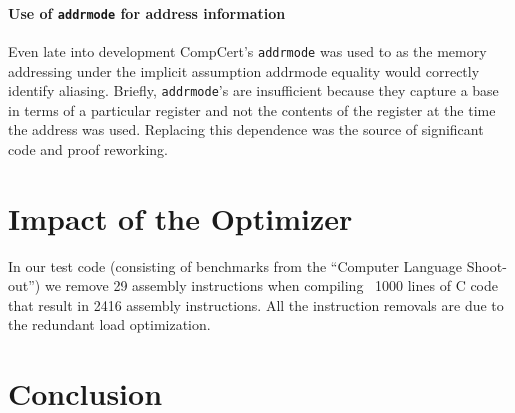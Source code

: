 \documentclass{article}
\begin{document}
\paragraph{Use of {\tt addrmode} for address information}
Even late into development CompCert's {\tt addrmode} was used to as the
memory addressing under the implicit assumption addrmode equality would 
correctly identify aliasing.  Briefly, {\tt addrmode}'s are
insufficient because they capture a base in terms of a particular register
and not the contents of the register at the time the address was used.
Replacing this dependence was the source of significant code and proof
reworking.


\section{Impact of the Optimizer}
In our test code (consisting of benchmarks from the ``Computer
Language Shoot-out'') we remove 29 assembly instructions when
compiling ~1000 lines of C code that result in 2416 assembly
instructions.  All the instruction removals are due to the redundant
load optimization.

\section{Conclusion}
\end{document}

